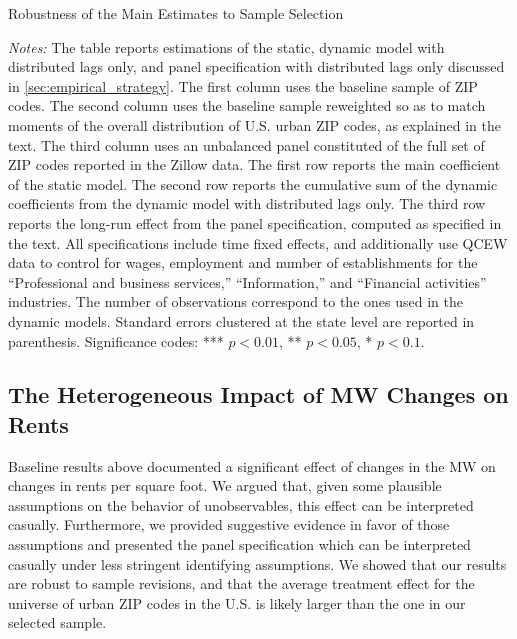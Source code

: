 \begin{table}[h!]\centering
	\caption{Robustness of the Main Estimates to Sample Selection}  %
	\label{tab:wgt_unbal_comparison}
	
	\begin{minipage}{0.95\textwidth}\footnotesize
	\vspace{3mm}	
	\textit{Notes:} The table reports estimations of the static, dynamic model with distributed
	lags only, and panel specification with distributed lags only discussed in 
	\autoref{sec:empirical_strategy}. The first column uses the baseline sample of ZIP codes. The 
	second column uses the baseline sample reweighted so as to match moments of the overall 
	distribution of U.S. urban ZIP codes, as explained in the text. The third column uses an 
	unbalanced 	panel constituted of the full set of ZIP codes reported in the Zillow data. The 
	first row reports the main coefficient of the static model. The second row reports the 
	cumulative sum of the dynamic coefficients from the dynamic model with distributed lags only. 
	The third row reports the long-run effect from the panel specification, computed as specified 
	in the text. All specifications include time fixed effects, and additionally use QCEW data to 
	control for wages, employment and number of establishments for the ``Professional and business 
	services,'' ``Information,'' and ``Financial activities'' industries. The number of observations 
	correspond to the ones used in the dynamic models. 
	Standard errors clustered at the state level are reported in parenthesis. Significance codes: 
	*** $p < 0.01$, ** $p < 0.05$, * $p < 0.1$.
	\end{minipage}
\end{table}



\subsection{The Heterogeneous Impact of MW Changes on Rents}\label{sec:heter}

Baseline results above documented a significant effect of changes in the MW on changes in rents 
per square foot. We argued that, given some plausible assumptions on the behavior of 
unobservables, this effect can be interpreted casually. Furthermore, we provided suggestive 
evidence in favor of those assumptions and presented the panel specification which can be 
interpreted casually under less stringent identifying assumptions. We showed that our results 
are robust to sample revisions, and that the average treatment effect for the universe of urban 
ZIP codes in the U.S. is likely larger than the one in our selected sample. 

